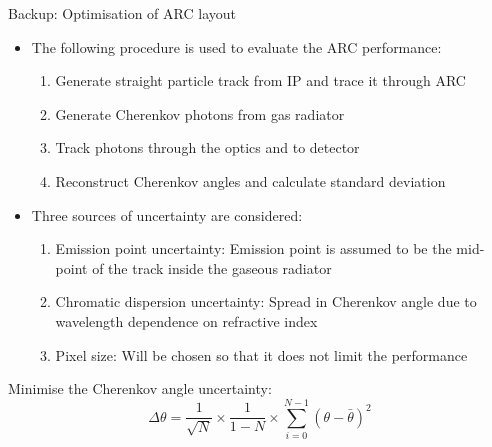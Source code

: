 \documentclass{beamer}
\begin{document}
\begin{frame}{Backup: Optimisation of ARC layout}
  \begin{itemize}
    \setlength\itemsep{0.7em}
    \item{The following procedure is used to evaluate the ARC performance:}
    \begin{enumerate}
      \setlength\itemsep{0.2em}
      \item{Generate straight particle track from IP and trace it through ARC}
      \item{Generate Cherenkov photons from gas radiator}
      \item{Track photons through the optics and to detector}
      \item{Reconstruct Cherenkov angles and calculate standard deviation}
    \end{enumerate}
    \item{Three sources of uncertainty are considered:}
    \begin{enumerate}
      \setlength\itemsep{0.2em}
      \item{Emission point uncertainty: Emission point is assumed to be the mid-point of the track inside the gaseous radiator}
      \item{Chromatic dispersion uncertainty: Spread in Cherenkov angle due to wavelength dependence on refractive index}
      \item{Pixel size: Will be chosen so that it does not limit the performance}
    \end{enumerate}
  \end{itemize}
  \begin{block}{Minimise the Cherenkov angle uncertainty:}
    \begin{equation*}
      \Delta\theta = \frac{1}{\sqrt{N}}\times\frac{1}{1 - N}\times\sum_{i = 0}^{N - 1}(\theta - \bar{\theta})^2
    \end{equation*}
  \end{block}
\end{frame}
\end{document}
